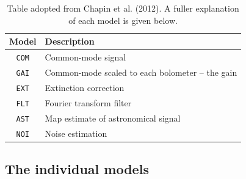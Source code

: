 \documentclass[twoside,11pt]{article}
\newcommand{\xlabel}[1]{}
\renewcommand{\_}{\texttt{\symbol{95}}}
\begin{document}
\setlength{\extrarowheight}{3pt}
\begin{table}
\centering
\begin{tabular}{c|l}
\hline
\textbf{Model} &\hspace{0.2cm} \textbf{Description} \\
\hline
\texttt{COM}&\hspace{0.2cm} Common-mode signal\\
\texttt{GAI}&\hspace{0.2cm} Common-mode scaled to each bolometer -- the gain\\
\texttt{EXT}&\hspace{0.2cm} Extinction correction\\
\texttt{FLT}&\hspace{0.2cm} Fourier transform filter\\
\texttt{AST}&\hspace{0.2cm} Map estimate of astronomical signal\\
\texttt{NOI}&\hspace{0.2cm} Noise estimation\\
\hline
\end{tabular}
\label{tab:mods}
\caption{\small Table adopted from Chapin et al. (2012). A fuller
explanation of each model is given below.}
\end{table}

\raggedbottom
\subsection{\xlabel{models}The individual models}
\label{sec:models}
\end{document}
